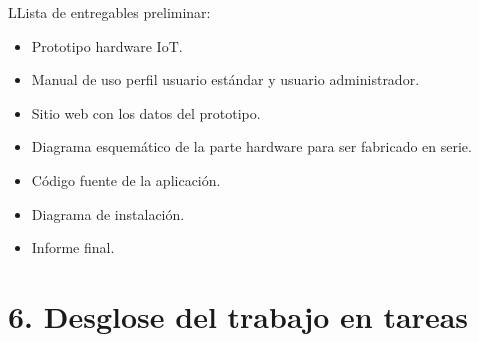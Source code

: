\documentclass[11pt]{charter}
\begin{document}
\begin{consigna}
LLista de entregables preliminar: 
\begin{itemize}
\item Prototipo hardware IoT.
\item Manual de uso perfil usuario estándar y usuario administrador.
\item Sitio web con los datos del prototipo.
\item Diagrama esquemático de la parte hardware para ser fabricado en serie.
\item Código fuente de la aplicación.
\item Diagrama de instalación.
\item Informe final.

\end{itemize}

\end{consigna}

\section{6. Desglose del trabajo en tareas}
\label{sec:wbs}
\end{document}
